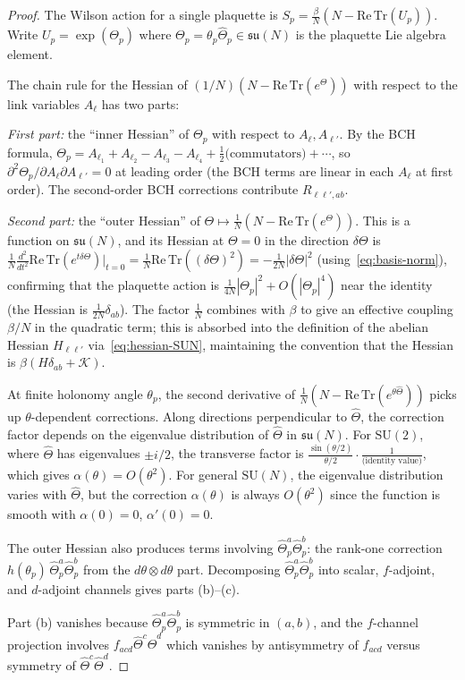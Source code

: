 \documentclass[11pt,a4paper]{article}
\theoremstyle{plain}
\theoremstyle{definition}
\theoremstyle{remark}
\newcommand{\SU}{\mathrm{SU}}
\newcommand{\su}{\mathfrak{su}}
\newcommand{\Tr}{\mathrm{Tr}}
\newcommand{\cK}{\mathcal{K}}
\begin{document}
\begin{proof}
The Wilson action for a single plaquette is
$S_p = \frac{\beta}{N}(N - \mathrm{Re}\,\Tr(U_p))$. Write
$U_p = \exp(\Theta_p)$ where
$\Theta_p = \theta_p\hat\Theta_p \in \su(N)$ is the plaquette
Lie algebra element.

The chain rule for the Hessian of $(1/N)(N-\mathrm{Re}\,\Tr(e^\Theta))$
with respect to the link variables $A_\ell$ has two parts:

\emph{First part:} the ``inner Hessian'' of
$\Theta_p$ with respect to $A_\ell, A_{\ell'}$. By the
BCH formula,
$\Theta_p = A_{\ell_1} + A_{\ell_2} - A_{\ell_3} - A_{\ell_4}
+ \frac{1}{2}\text{(commutators)} + \cdots$, so
$\partial^2\Theta_p/\partial A_\ell \partial A_{\ell'} = 0$
at leading order (the BCH terms are linear in each $A_\ell$ at
first order). The second-order BCH corrections contribute
$R_{\ell\ell',ab}$.

\emph{Second part:} the ``outer Hessian'' of
$\Theta \mapsto \frac{1}{N}(N-\mathrm{Re}\,\Tr(e^{\Theta}))$.
This is a function on $\su(N)$, and its Hessian at $\Theta = 0$
in the direction $\delta\Theta$ is
$\frac{1}{N}\frac{d^2}{dt^2}\mathrm{Re}\,\Tr(e^{t\delta\Theta})\bigr|_{t=0}
= \frac{1}{N}\mathrm{Re}\,\Tr((\delta\Theta)^2)
= -\frac{1}{2N}|\delta\Theta|^2$
(using~\eqref{eq:basis-norm}), confirming that the plaquette
action is $\frac{1}{4N}|\Theta_p|^2 + O(|\Theta_p|^4)$
near the identity (the Hessian is $\frac{1}{2N}\delta_{ab}$). The factor $\frac{1}{N}$ combines with
$\beta$ to give an effective coupling $\beta/N$ in the
quadratic term; this is absorbed into the definition of the
abelian Hessian $H_{\ell\ell'}$ via~\eqref{eq:hessian-SUN},
maintaining the convention that the Hessian is
$\beta(H\delta_{ab} + \cK)$.

At finite holonomy angle $\theta_p$, the second derivative of
$\frac{1}{N}(N - \mathrm{Re}\,\Tr(e^{\theta\hat\Theta}))$
picks up $\theta$-dependent corrections. Along directions
perpendicular to $\hat\Theta$, the correction factor depends
on the eigenvalue distribution of $\hat\Theta$ in $\su(N)$.
For $\SU(2)$, where $\hat\Theta$ has eigenvalues $\pm i/2$,
the transverse factor is
$\frac{\sin(\theta/2)}{\theta/2}\cdot\frac{1}{\text{(identity value)}}$,
which gives $\alpha(\theta) = O(\theta^2)$.
For general $\SU(N)$, the eigenvalue distribution varies with
$\hat\Theta$, but the correction $\alpha(\theta)$ is always
$O(\theta^2)$ since the function is smooth with
$\alpha(0) = 0$, $\alpha'(0) = 0$.

The outer Hessian also produces terms involving
$\hat\Theta_p^a\hat\Theta_p^b$: the rank-one correction
$h(\theta_p)\,\hat\Theta_p^a\hat\Theta_p^b$ from the
$d\theta \otimes d\theta$ part. Decomposing
$\hat\Theta_p^a\hat\Theta_p^b$ into scalar, $f$-adjoint, and
$d$-adjoint channels gives parts (b)--(c).

Part (b) vanishes because $\hat\Theta_p^a\hat\Theta_p^b$ is
symmetric in $(a,b)$, and the $f$-channel projection involves
$f_{acd}\hat\Theta^c\hat\Theta^d$ which vanishes by
antisymmetry of $f_{acd}$ versus symmetry of
$\hat\Theta^c\hat\Theta^d$.
\end{proof}
\end{document}

